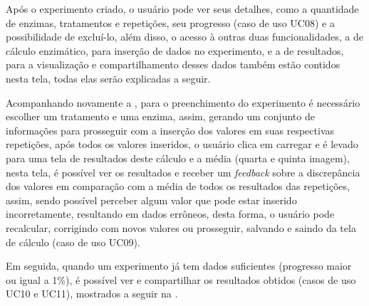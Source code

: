 Após o experimento criado, o usuário pode ver seus detalhes, como a quantidade de enzimas, tratamentos e repetições, seu progresso (caso de uso UC08) e a possibilidade de excluí-lo, além disso, o acesso à outras duas funcionalidades, a de cálculo enzimático, para inserção de dados no experimento, e a de resultados, para a visualização e compartilhamento desses dados também estão contidos nesta tela, todas elas serão explicadas a seguir.

Acompanhando novamente a , para o preenchimento do experimento é necessário escolher um tratamento e uma enzima, assim, gerando um conjunto de informações para prosseguir com a inserção dos valores em suas respectivas repetições, após todos os valores inseridos, o usuário clica em carregar e é levado para uma tela de resultados deste cálculo e a média (quarta e quinta imagem), nesta tela, é possível ver os resultados e receber um \textit{feedback} sobre a discrepância dos valores em comparação com a média de todos os resultados das repetições, assim, sendo possível perceber algum valor que pode estar inserido incorretamente, resultando em dados errôneos, desta forma, o usuário pode recalcular, corrigindo com novos valores ou prosseguir, salvando e saindo da tela de cálculo (caso de uso UC09).

Em seguida, quando um experimento já tem dados suficientes (progresso maior ou igual a 1\%), é possível ver e compartilhar os resultados obtidos (casos de uso UC10 e UC11), mostrados a seguir na .

